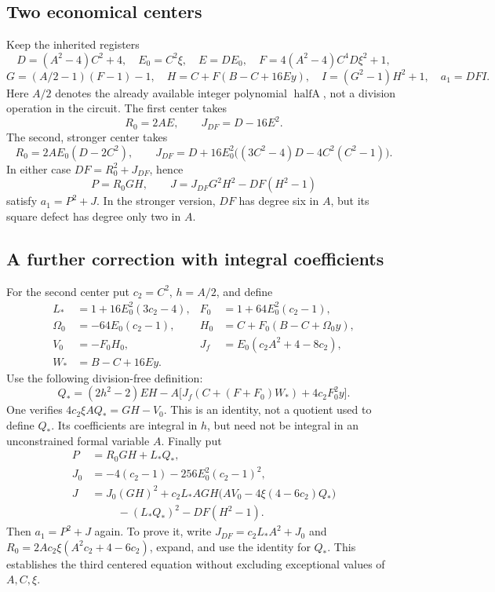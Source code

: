 \subsection{Two economical centers}
Keep the inherited registers
\[
 D=(A^2-4)C^2+4,\quad E_0=C^2\xi,\quad E=DE_0,
 \quad F=4(A^2-4)C^4D\xi^2+1,
\]
\[
 G=(A/2-1)(F-1)-1,\quad
 H=C+F(B-C+16Ey),\quad I=(G^2-1)H^2+1,
 \quad a_1=DFI.
\]
Here $A/2$ denotes the already available integer polynomial
$\operatorname{halfA}$, not a division operation in the circuit.
The first center takes
\[
 R_0=2AE,\qquad J_{DF}=D-16E^2.
\]
The second, stronger center takes
\[
 R_0=2AE_0(D-2C^2),\qquad
 J_{DF}=D+16E_0^2\bigl((3C^2-4)D-4C^2(C^2-1)\bigr).
\]
In either case $DF=R_0^2+J_{DF}$, hence
\[
 P=R_0GH,\qquad J=J_{DF}G^2H^2-DF(H^2-1)
\]
satisfy $a_1=P^2+J$. In the stronger version, $DF$ has degree six in
$A$, but its square defect has degree only two in $A$.

\subsection{A further correction with integral coefficients}
For the second center put $c_2=C^2$, $h=A/2$, and define
\begin{align*}
 L_*&=1+16E_0^2(3c_2-4),& F_0&=1+64E_0^2(c_2-1),\\
 \Omega_0&=-64E_0(c_2-1),& H_0&=C+F_0(B-C+\Omega_0y),\\
 V_0&=-F_0H_0,& J_f&=E_0(c_2A^2+4-8c_2),\\
 W_*&=B-C+16Ey.
\end{align*}
Use the following division-free definition:
\[
 Q_*=(2h^2-2)EH-A\bigl[J_f(C+(F+F_0)W_*)+4c_2F_0^2y\bigr].
\]
One verifies $4c_2\xi A Q_*=GH-V_0$. This is an identity, not a quotient
used to define $Q_*$. Its coefficients are integral in $h$, but need not
be integral in an unconstrained formal variable $A$.
Finally put
\begin{align*}
 P&=R_0GH+L_*Q_*,\\
 J_0&=-4(c_2-1)-256E_0^2(c_2-1)^2,\\
 J&=J_0(GH)^2+c_2L_*AGH\bigl(AV_0-4\xi(4-6c_2)Q_*\bigr)\\
 &\hspace{1cm}-(L_*Q_*)^2-DF(H^2-1).
\end{align*}
Then $a_1=P^2+J$ again. To prove it, write
$J_{DF}=c_2L_*A^2+J_0$ and
$R_0=2Ac_2\xi(A^2c_2+4-6c_2)$, expand, and use the identity for $Q_*$.
This establishes the third centered equation without excluding exceptional
values of $A,C,\xi$.

